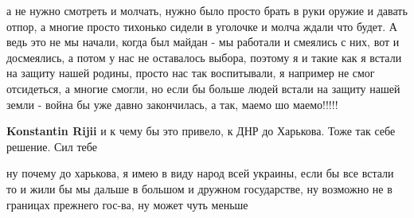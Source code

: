 \begin{itemize}
\begin{itemize}
а не нужно смотреть и молчать, нужно было просто брать в руки оружие и давать
отпор, а многие просто тихонько сидели в уголочке и молча ждали что будет. А
ведь это не мы начали, когда был майдан - мы работали и смеялись с них, вот и
досмеялись, а потом у нас не оставалось выбора, поэтому я и такие как я встали
на защиту нашей родины, просто нас так воспитывали, я например не смог
отсидеться, а многие смогли, но если бы больше людей встали на защиту нашей
земли - война бы уже давно закончилась, а так, маемо шо маемо!!!!!


 
\textbf{Konstantin Rijii} и к чему бы это привело, к ДНР до Харькова. Тоже так себе решение.
Сил тебе

 

ну почему до харькова, я имею в виду народ всей украины, если бы все встали то
и жили бы мы дальше в большом и дружном государстве, ну возможно не в границах
прежнего гос-ва, ну может чуть меньше
\end{itemize}

\end{itemize}

